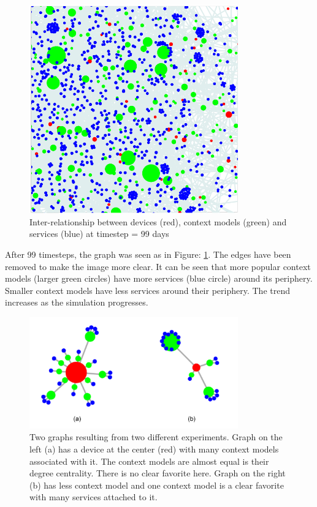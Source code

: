 \begin{figure}[!htb]
  \centering
  \includegraphics[width=9cm]{figures/result_component_relationship_99.png}
  \caption{Inter-relationship between devices (red), context models (green) and services (blue) at timestep = 99 days}
  \label{fig:result_component_relationship_99}
\end{figure}

After 99 timesteps, the graph was seen as in Figure: \ref{fig:result_component_relationship_99}. The edges have been removed to make the image more clear. It can be seen that more popular context models (larger green circles) have more services (blue circle) around its periphery. Smaller context models have less services around their periphery. The trend increases as the simulation progresses.

\begin{figure}[!htb]
  \centering
  \includegraphics[width=9cm]{figures/result_compare_graph_user_personality.pdf}
  \caption{Two graphs resulting from two different experiments. Graph on the left (a) has a device at the center (red) with many context models associated with it. The context models are almost equal is their degree centrality. There is no clear favorite here. Graph on the right (b) has less context model and one context model is a clear favorite with many services attached to it.}
  \label{fig:result_compare_graph_user_personality}
\end{figure}

